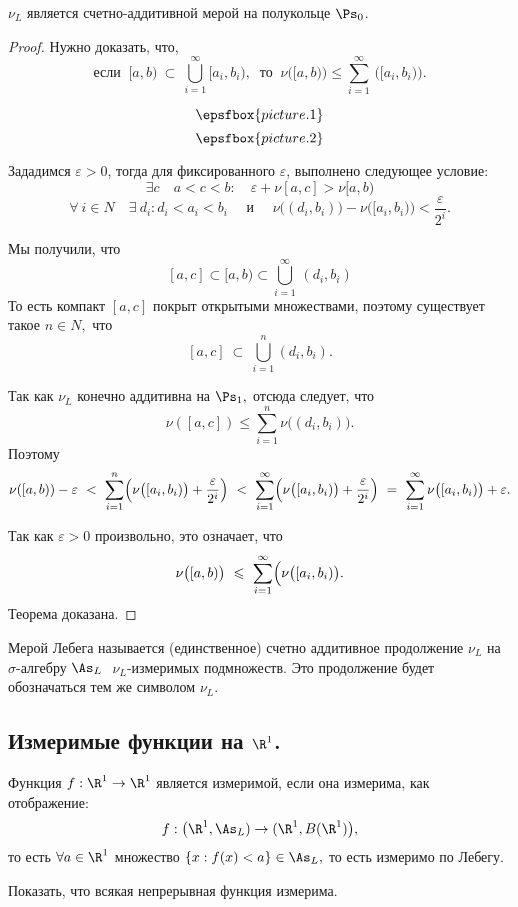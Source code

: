 \documentclass[a4paper]{article}
\begin{document}
\begin{theorem}
$\nu_L$ является счетно-аддитивной мерой на полукольце
$\Ps_0$.
\end{theorem}
\begin{proof}
Нужно доказать, что, $$\mbox{если }\ [a, b)\  \subset \
\bigcup\limits_{i=1}^\infty [a_i, b_i),\ \mbox{ то } \ \nu
\bigl([a,b) \bigr) \leqslant\sum_{i=1}^\infty \,\bigl( [a_i,b_i)
\bigr).
$$

$$\epsfbox{picture.1}$$
$$\epsfbox{picture.2}$$

Зададимся $\varepsilon>0$, тогда для фиксированного $\varepsilon$,
выполнено следующее условие:
$$
\exists c \quad  a<c<b:\quad \varepsilon + \nu[a,c] > \nu[a,b)
$$
$$
\forall \ i \in N \quad \exists \ d_i: d_i < a_i < b_i \quad
\mbox{ и }\quad \nu \bigl((d_i, b_i)\bigr) - \nu \bigl([a_i,
b_i)\bigr) < \frac{\varepsilon}{2^i}.
$$

Мы получили, что
$$
[a,c] \subset [a,b) \subset \bigcup_{i=1}^{\infty} \,(d_i, b_i)
$$
То есть компакт $[a, c]$ покрыт открытыми множествами, поэтому
существует такое $n\in N,$ что $$[a, c]\  \subset \
\bigcup_{i=1}^{n} (d_i, b_i).$$

Так как $\nu_L$ конечно аддитивна на $\Ps_1,$ отсюда
следует, что
$$
\nu ([a, c]) \leqslant \sum\limits_{i=1}^n \nu \bigl( (d_i, b_i)
\bigr).
$$
Поэтому
$$
\nu ([a, b)) - \varepsilon \ < \ \sum\limits_{i=1}^n \Bigl( \nu
\bigl([a_i, b_i)\bigr) + \frac{\varepsilon}{2^i}\Bigr)\ < \
\sum\limits_{i=1}^\infty \Bigl( \nu \bigl([a_i, b_i)\bigr) +
\frac{\varepsilon}{2^i}\Bigr) \ = \ \sum\limits_{i=1}^\infty \nu
\bigl([a_i, b_i)\bigr) + \varepsilon.
$$

Так как $\varepsilon>0$ произвольно, это означает, что
$$
\nu  \bigl([a, b)\bigr)\ \leqslant\ \sum\limits_{i=1}^\infty
\Bigl( \nu \bigl([a_i, b_i)\bigr).
$$
Теорема доказана.

\end{proof}

\begin{df}
Мерой Лебега называется (единственное) счетно аддитивное
продолжение $\nu_L$ на $\sigma$-алгебру $\As_L\ $
$\nu_L$-измеримых подмножеств. Это продолжение будет обозначаться
тем же символом $\nu_L$.
\end{df}
\bigskip

\subsection{Измеримые функции на $\R^1$.}

\begin{df} Функция $f: \R^1 \rightarrow \R^1$
является измеримой, если она измерима, как отображение:
$$f:
\bigl(\R^1,\As_L) \rightarrow
(\R^1,B(\R^1) \bigr),
$$
то есть $\forall a \in \R^1$ множество $\{x: f(x) < a \}
\in \As_L,$ то есть измеримо по Лебегу.
\end{df}
\begin{problem}
Показать, что всякая непрерывная функция измерима.
\end{problem}
\end{document}
